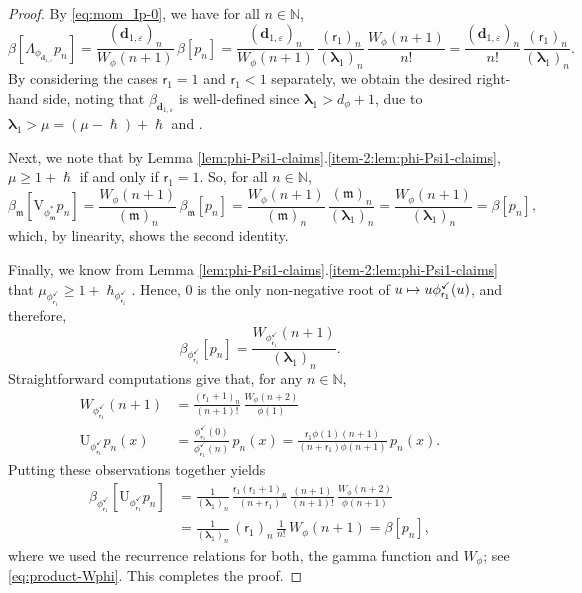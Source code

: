 \documentclass[JEP,XML,SOM,Unicode]{cedram}
\let\epsilon\varepsilon
\newcommand\mto{\mathchoice{\longmapsto}{\mapsto}{\mapsto}{\mapsto}}
\theoremstyle{plain}
\theoremstyle{definition}
\newcommand{\N}{\mathbb{N}}
\newcommand{\m}{\mathfrak{m}}
\newcommand{\dz}{{\bm{d}}_{1,\epsilon}}
\newcommand{\lam}{{\bm{\lambda}_1}}
\newcommand{\vat}{{\mathsf{r}_1}}
\newcommand{\phm}{{\phi_\m^*}}
\renewcommand{\varphi}{{\phi_{\vat}^{\checkmark}}}
\newcommand{\gab}[1][\lam,\mo]{{\beta_{#1}}}
\let\h\hslash
\let\mo\mu
\let\bpsi\beta
\begin{document}
\begin{proof}
By \eqref{eq:mom_Ip-0}, we have for all $n \in \N$,
\begin{equation*}
\bpsi[\Lambda_{\phi_{\dz}} p_n] = \frac{(\dz)_n}{W_{\phi}(n+1)}\, \bpsi[p_n]=
\frac{(\dz)_n}{W_{\phi}(n+1)}\, \frac{(\vat)_n}{(\lam)_n}\,\frac{W_{\phi}(n+1)}{n!} =\frac{(\dz)_n}{n!}\, \frac{(\vat)_n}{(\lam)_n}.
\end{equation*}
By considering the cases $\vat=1$ and $\vat<1$ separately, we obtain the desired right-hand side, noting that $\gab[\dz]$ is well-defined since $\lam > d_\phi +1$, due to $ \lam > \mo = (\mo-\h) + \h$ and \cite[Prop.\,4.4(1)]{Patie-Savov-GeL}.

Next, we note that by Lemma \ref{lem:phi-Psi1-claims}.\eqref{item-2:lem:phi-Psi1-claims},
$\mo \geq 1+\h$ if and only if $\vat = 1$. So, for all $n \in \N$,
\begin{equation*}
\gab[\m] [\mathrm{V}_{\phm} p_n] = \frac{W_{\phi}(n+1)}{(\m)_n}\, \gab[\m] [p_n] = \frac{W_{\phi}(n+1)}{(\m)_n}\, \frac{(\m)_n}{(\lam)_n} = \frac{W_{\phi}(n+1)}{(\lam)_n} = \bpsi[p_n],
\end{equation*}
which, by linearity, shows the second identity.

Finally, we know from Lemma \ref{lem:phi-Psi1-claims}.\eqref{item-2:lem:phi-Psi1-claims} that
$\mo_\varphi \geq 1+\h_\varphi$. Hence, $0$ is the only non-negative root of $u \mto u\varphi(u)$, and therefore,
\begin{equation*}
\bpsi_\varphi [p_n] = \frac{W_\varphi(n+1)}{(\lam)_n}.
\end{equation*}
Straightforward computations give that, for any $n \in \N$,
\begin{align*}
W_\varphi(n+1) &= \frac{(\vat+1)_{n}}{(n+1)!}\, \frac{W_\phi(n+2)}{\phi(1)} \\
\tag*{and} \mathrm{U}_\varphi p_n(x) &= \frac{\varphi(0)}{\varphi(n)}\, p_n(x) = \frac{\vat\phi(1)(n+1)}{(n+\vat)\phi(n+1)}\, p_n(x).
\end{align*}
Putting these observations together yields
\begin{align*}
\bpsi_\varphi[\mathrm{U}_\varphi p_n]&= \frac{1}{(\lam)_n}\, \frac{\vat (\vat+1)_{n}}{(n+\vat)}\, \frac{(n+1)}{(n+1)!}\, \frac{W_{\phi}(n+2)}{\phi(n+1)}\\
&=\frac{1}{(\lam)_n}\, (\vat)_n\, \frac{1}{n!}\, W_\phi(n+1) = \bpsi[p_n],
\end{align*}
where we used the recurrence relations for both, the gamma function and $W_\phi$; see \eg \eqref{eq:product-Wphi}.
This completes the proof.
\end{proof}
\end{document}
